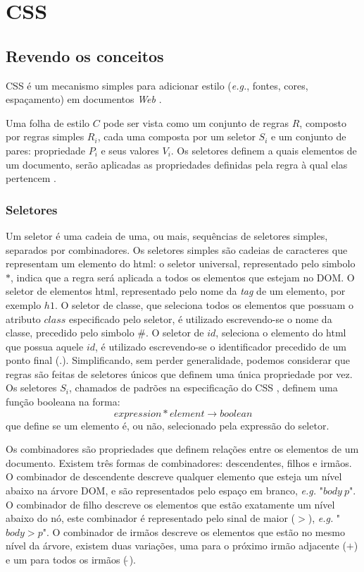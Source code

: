 \chapter{CSS}
\label{chap:CSS}
\section{Revendo os conceitos}

CSS é um mecanismo simples para adicionar estilo (\textit{e.g.}, fontes, cores, espaçamento) em documentos \textit{Web} \cite{W3Ccss2015}.

Uma folha de estilo \(C\) pode ser vista como um conjunto de regras \(R\), composto por regras simples \(R_i\), cada uma composta por um seletor \(S_i\) e um conjunto de pares: propriedade \(P_i\) e seus valores \(V_i\). Os seletores definem a quais elementos de um documento, serão aplicadas as propriedades definidas pela regra à qual elas pertencem \cite{Geneves2012}.

\subsection{Seletores}
\label{subsec:seletores}
Um seletor é uma cadeia de uma, ou mais, sequências de seletores simples, separados por combinadores. Os seletores simples são cadeias de caracteres que representam um elemento do html: o seletor universal, representado pelo simbolo \(\ast\), indica que a regra será aplicada a todos os elementos que estejam no DOM. O seletor de elementos html, representado pelo nome da \textit{tag} de um elemento, por exemplo \(h1\). O seletor de classe, que seleciona todos os elementos que possuam o atributo \(class\) especificado pelo seletor, é utilizado escrevendo-se o nome da classe, precedido pelo simbolo \(\#\). O seletor de \(id\), seleciona o elemento do html que possua aquele \(id\), é utilizado escrevendo-se o identificador precedido de um ponto final (\(.\)). 
Simplificando, sem perder generalidade, podemos considerar que regras são feitas de seletores únicos que definem uma única propriedade por vez. Os seletores \(S_i\), chamados de padrões na especificação do CSS \cite{CSSspec2009}, definem uma função booleana na forma:
\begin{equation}
	expression * element \rightarrow boolean
\end{equation}
que define se um elemento é, ou não, selecionado pela expressão do seletor.

Os combinadores são propriedades que definem relações entre os elementos de um documento. Existem três formas de combinadores: descendentes, filhos e irmãos. O combinador de descendente descreve qualquer elemento que esteja um nível abaixo na árvore DOM, e são representados pelo espaço em branco, \textit{e.g.} "$body\ p$". O combinador de filho descreve os elementos que estão exatamente um nível abaixo do nó, este combinador é representado pelo sinal de maior ($>$), \textit{e.g.} "$body > p$". O combinador de irmãos descreve os elementos que estão no mesmo nível da árvore, existem duas variações, uma para o próximo irmão adjacente ($+$) e um para todos os irmãos ($\tilde{~}$).

